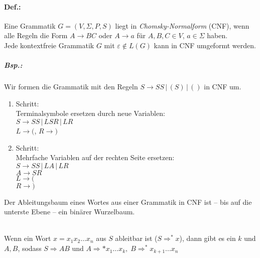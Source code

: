 \paragraph{Def.:} Eine Grammatik $G=(V,\Sigma, P, S)$ liegt in \emph{Chomsky-Normalform} (CNF), wenn alle Regeln die Form $A\to BC$ oder $A\to a$ für $A,B,C \in V$, $a \in \Sigma$ haben.\\
Jede kontextfreie Grammatik $G$ mit $\varepsilon \not \in L(G)$ kann in CNF umgeformt werden.
\subparagraph{Bsp.:} Wir formen die Grammatik  mit den Regeln $S\to SS \,|\, (S) \,|\, ()$ in CNF um.
\begin{enumerate}[label=\arabic*.]
\item Schritt:\\
Terminalsymbole ersetzen durch neue Variablen: \\
$S\to SS \,|\, LSR \,|\, LR$\\
$L\to ($, $R \to )$
\item Schritt:\\
Mehrfache Variablen auf der rechten Seite ersetzen:\\
$S\to SS \,|\, LA \,|\, LR$\\
$A \to SR$\\
$L\to ($\\
$R\to )$
\end{enumerate}
Der Ableitungsbaum eines Wortes aus einer Grammatik in CNF ist -- bis auf die unterste Ebene -- ein binärer Wurzelbaum.\\
\\
Wenn ein Wort $x=x_1x_2\dots x_n$ aus $S$ ableitbar ist ($S\Rightarrow^*x$), dann gibt es ein $ k $ und $ A,B $, sodass $ S\Rightarrow AB $ und $ A \Rightarrow* x_1\dots x_k , \; B\Rightarrow^*x_{k+1}...x_n $\\
